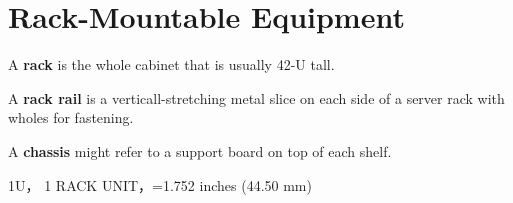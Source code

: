 \section{Rack-Mountable Equipment}

A \textbf{rack} is the whole cabinet that is usually 42-U tall.

A \textbf{rack rail} is a verticall-stretching metal slice on each side of a
server rack with wholes for fastening.

A \textbf{chassis} might refer to a support board on top of each shelf.

1U， 1 RACK UNIT，=1.752 inches (44.50 mm)
